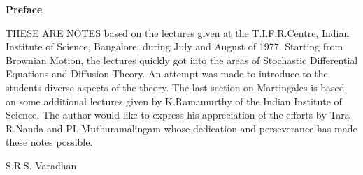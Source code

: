 \begin{center}
{\Large\bf Preface}
\end{center}
\medskip

THESE ARE NOTES based on the lectures given at the T.I.F.R.\@ Centre,
Indian Institute of Science, Bangalore, during July and August of
1977. Starting from Brownian Motion, the lectures quickly got into the
areas of Stochastic Differential Equations and Diffusion Theory. An
attempt was made to introduce to the students diverse aspects of the
theory. The last section on Martingales is based on some additional
lectures given by K.\@ Ramamurthy of the Indian Institute of
Science. The author would like to express his appreciation of the
efforts by Tara R.\@ Nanda and PL.\@ Muthuramalingam whose dedication
and perseverance has made these notes possible.

\bigskip

\hfill S.R.S. Varadhan\qquad

